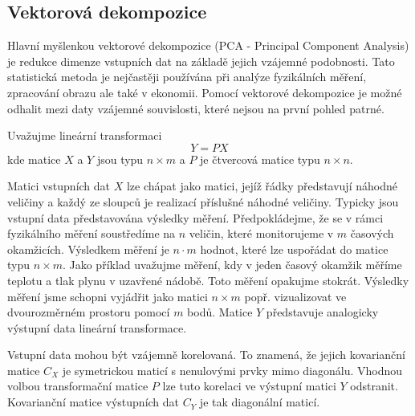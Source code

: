 \documentclass[a4paper]{book}
\begin{document}
\subsection{Vektorová dekompozice}

Hlavní myšlenkou vektorové dekompozice (PCA - Principal Component Analysis) je redukce dimenze vstupních dat na základě jejich vzájemné podobnosti. Tato statistická metoda je nejčastěji používána při analýze fyzikálních měření, zpracování obrazu ale také v ekonomii. Pomocí vektorové dekompozice je možné odhalit mezi daty vzájemné souvislosti, které nejsou na první pohled patrné.

Uvažujme lineární transformaci
\begin{equation}
Y = PX
\end{equation}
kde matice $X$ a $Y$ jsou typu $n \times m$ a $P$ je čtvercová matice typu $n \times n$.

Matici vstupních dat $X$ lze chápat jako matici, jejíž řádky představují náhodné veličiny a každý ze sloupců je realizací příslušné náhodné veličiny. Typicky jsou vstupní data představována výsledky měření. Předpokládejme, že se v rámci fyzikálního měření soustředíme na $n$ veličin, které monitorujeme v $m$ časových okamžicích. Výsledkem měření je $n \cdot m$ hodnot, které lze uspořádat do matice typu $n \times m$. Jako příklad uvažujme měření, kdy v jeden časový okamžik měříme teplotu a tlak plynu v uzavřené nádobě. Toto měření opakujme stokrát. Výsledky měření jsme schopni vyjádřit jako matici $n \times m$ popř. vizualizovat ve dvourozměrném prostoru pomocí $m$ bodů. Matice $Y$ představuje analogicky výstupní data lineární transformace.

Vstupní data mohou být vzájemně korelovaná. To znamená, že jejich kovarianční matice $C_X$ je symetrickou maticí s nenulovými prvky mimo diagonálu. Vhodnou volbou transformační matice $P$ lze tuto korelaci ve výstupní matici $Y$ odstranit. Kovarianční matice výstupních dat $C_Y$ je tak diagonální maticí.
\end{document}

